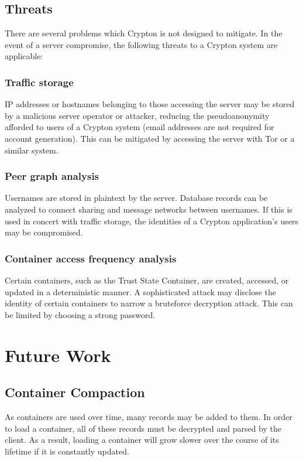 \documentclass[conference]{IEEEtran}
\begin{document}
\subsection{Threats}
There are several problems which Crypton is not designed to mitigate.
In the event of a server compromise, the following threats to a Crypton system
are applicable:

\subsubsection{Traffic storage}
IP addresses or hostnames belonging to those accessing the server may be stored
by a malicious server operator or attacker, reducing the pseudoanonymity afforded
to users of a Crypton system (email addresses are not required for account generation).
This can be mitigated by accessing the server with Tor\cite{tor} or a similar system.

\subsubsection{Peer graph analysis}
Usernames are stored in plaintext by the server. Database records can be analyzed
to connect sharing and message networks between usernames. If this is used in
concert with traffic storage, the identities of a Crypton application's users may
be compromised.

\subsubsection{Container access frequency analysis}
Certain containers, such as the Trust State Container, are created, accessed, or
updated in a deterministic manner. A sophisticated attack may disclose
the identity of certain containers to narrow a bruteforce decryption attack.
This can be limited by choosing a strong password.

\section{Future Work}

\subsection{Container Compaction}
As containers are used over time, many records may be added to them. In order to
load a container, all of these records must be decrypted and parsed by the client.
As a result, loading a container will grow slower over the course of its lifetime
if it is constantly updated.
\end{document}
